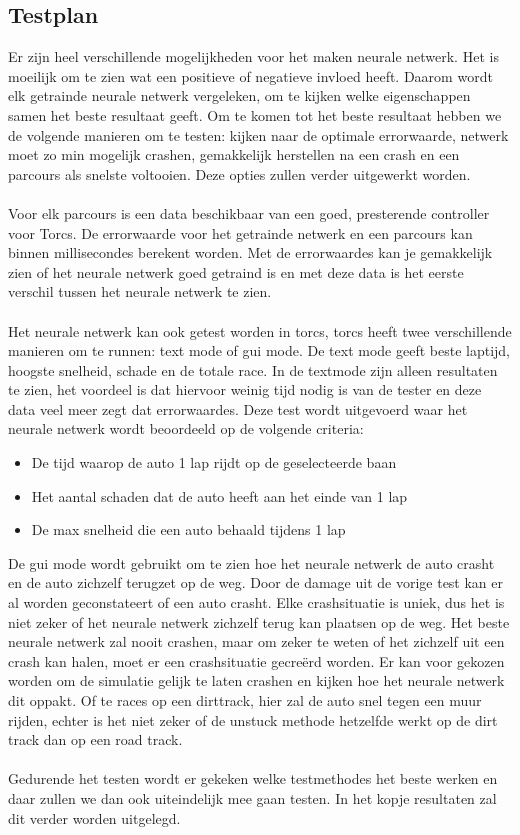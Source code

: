 \pagebreak
\subsection{Testplan}
Er zijn heel verschillende mogelijkheden voor het maken neurale netwerk. Het is moeilijk om te zien wat een positieve of negatieve invloed heeft. Daarom wordt elk getrainde neurale netwerk vergeleken, om te kijken welke eigenschappen samen het beste resultaat geeft. Om te komen tot het beste resultaat hebben we de volgende manieren om te testen: kijken naar de optimale errorwaarde, netwerk moet zo min mogelijk crashen, gemakkelijk herstellen na een crash en een parcours als snelste voltooien. Deze opties zullen verder uitgewerkt worden. \\\\
Voor elk parcours is een data beschikbaar van een goed, presterende controller voor Torcs. De errorwaarde voor het getrainde netwerk en een parcours kan binnen millisecondes berekent worden. Met de errorwaardes kan je gemakkelijk zien of het neurale netwerk goed getraind is en met deze data is het eerste verschil tussen het neurale netwerk te zien. \\\\
Het neurale netwerk kan ook getest worden in torcs, torcs heeft twee verschillende manieren om te runnen: text mode of gui mode. De text mode geeft beste laptijd, hoogste snelheid, schade en de totale race. In de textmode zijn alleen resultaten te zien, het voordeel is dat hiervoor weinig tijd nodig is van de tester en deze data veel meer zegt dat errorwaardes. Deze test wordt uitgevoerd waar het neurale netwerk wordt beoordeeld op de volgende criteria:
\begin{itemize}
\item De tijd waarop de auto 1 lap rijdt op de geselecteerde baan
\item Het aantal schaden dat de auto heeft aan het einde van 1 lap
\item De max snelheid die een auto behaald tijdens 1 lap
\end{itemize}
\noindent De gui mode wordt gebruikt om te zien hoe het neurale netwerk de auto crasht en de auto zichzelf terugzet op de weg. Door de damage uit de vorige test kan er al worden geconstateert of een auto crasht. Elke crashsituatie is uniek, dus het is niet zeker of het neurale netwerk zichzelf terug kan plaatsen op de weg. Het beste neurale netwerk zal nooit crashen, maar om zeker te weten of het zichzelf uit een crash kan halen, moet er een crashsituatie gecre\"erd worden. Er kan voor gekozen worden om de simulatie gelijk te laten crashen en kijken hoe het neurale netwerk dit oppakt. Of te races op een dirttrack, hier zal de auto snel tegen een muur rijden, echter is het niet zeker of de unstuck methode hetzelfde werkt op de dirt track dan op een road track.\\\\
Gedurende het testen wordt er gekeken welke testmethodes het beste werken en daar zullen we dan ook uiteindelijk mee gaan testen. In het kopje resultaten zal dit verder worden uitgelegd. 
